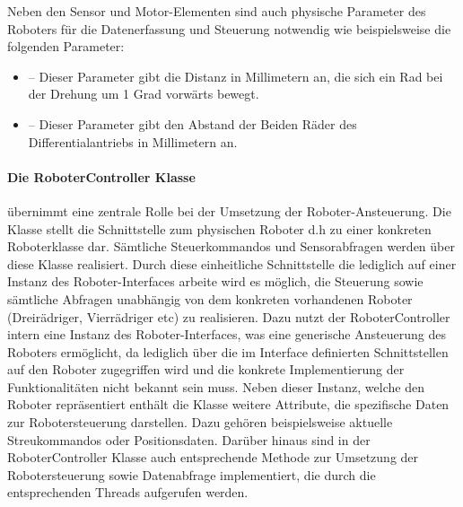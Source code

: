 Neben den Sensor und Motor-Elementen sind auch physische Parameter des Roboters für die Datenerfassung und Steuerung notwendig wie
beispielsweise die folgenden Parameter:
\begin{itemize}
	\item{} -- Dieser Parameter gibt die Distanz in Millimetern 
	an, die sich ein Rad bei der Drehung um 1 Grad vorwärts bewegt.  
	\item{} -- Dieser Parameter gibt den Abstand der Beiden Räder 
	des Differentialantriebs in Millimetern an.
\end{itemize}

\paragraph{Die RoboterController Klasse} übernimmt eine zentrale Rolle bei der Umsetzung der Roboter-Ansteuerung. Die Klasse stellt die 
Schnittstelle zum physischen Roboter d.h zu einer konkreten Roboterklasse dar. Sämtliche 
Steuerkommandos und Sensorabfragen werden über diese Klasse realisiert. Durch diese einheitliche Schnittstelle die lediglich auf einer
Instanz des Roboter-Interfaces arbeite wird es möglich, die Steuerung sowie sämtliche Abfragen unabhängig von dem konkreten vorhandenen 
Roboter (Dreirädriger, Vierrädriger etc) zu realisieren. Dazu nutzt der RoboterController intern eine Instanz des Roboter-Interfaces, 
was eine generische Ansteuerung des Roboters ermöglicht, da lediglich über die im Interface definierten Schnittstellen auf den Roboter
zugegriffen wird und die konkrete Implementierung der Funktionalitäten nicht bekannt sein muss.
Neben dieser Instanz, welche den Roboter repräsentiert enthält die Klasse weitere Attribute, die spezifische Daten zur Robotersteuerung
darstellen. Dazu gehören beispielsweise aktuelle Streukommandos oder Positionsdaten. Darüber hinaus sind in der RoboterController Klasse
auch entsprechende Methode zur Umsetzung der Robotersteuerung sowie Datenabfrage implementiert, die durch die entsprechenden Threads aufgerufen
werden.
